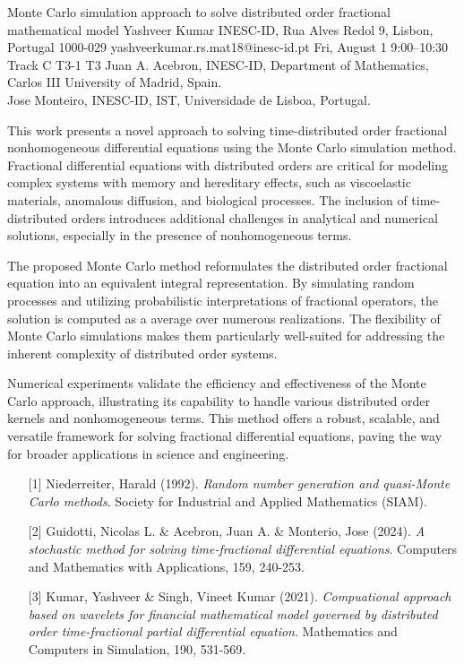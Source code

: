 \begin{talk}
  {Monte Carlo simulation approach to solve distributed order fractional mathematical model}%
  {Yashveer Kumar}%
  {INESC-ID, Rua Alves Redol 9, Lisbon, Portugal 1000-029}%
  {yashveerkumar.rs.mat18@inesc-id.pt}%
  {}%
  {}%
  {Fri, August 1 9:00–10:30 Track C}%
  {T3-1}%
  {T3}%
  {Juan A. Acebron, INESC-ID,  Department of Mathematics, Carlos III University of Madrid, Spain.\\
  	Jose Monteiro, INESC-ID, IST, Universidade de Lisboa, Portugal.}%
				
			
			
This work presents a novel approach to solving time-distributed order fractional nonhomogeneous differential equations using the Monte Carlo simulation method. Fractional differential equations with distributed orders are critical for modeling complex systems with memory and hereditary effects, such as viscoelastic materials, anomalous diffusion, and biological processes. The inclusion of time-distributed orders introduces additional challenges in analytical and numerical solutions, especially in the presence of nonhomogeneous terms.

The proposed Monte Carlo method reformulates the distributed order fractional equation into an equivalent integral representation. By simulating random processes and utilizing probabilistic interpretations of fractional operators, the solution is computed as a average over numerous realizations. The flexibility of Monte Carlo simulations makes them particularly well-suited for addressing the inherent complexity of distributed order systems.

Numerical experiments validate the efficiency and effectiveness of the Monte Carlo approach, illustrating its capability to handle various distributed order kernels and nonhomogeneous terms. This method offers a robust, scalable, and versatile framework for solving fractional differential equations, paving the way for broader applications in science and engineering.

\medskip
\begin{enumerate}
	\item[{[1]}] Niederreiter, Harald (1992). {\it Random number generation and quasi-Monte Carlo methods}. Society for Industrial and Applied Mathematics (SIAM).
	\item[{[2]}] Guidotti, Nicolas L. \& Acebron, Juan A.  \&  Monterio, Jose (2024). {\it A stochastic method for solving time-fractional differential equations}. Computers and Mathematics with Applications, 159, 240-253.
	\item[{[3]}] Kumar, Yashveer \& Singh, Vineet Kumar (2021). {\it Compuational approach based on wavelets for financial mathematical model governed by distributed order time-fractional partial differential equation}. Mathematics and Computers in Simulation, 190, 531-569.
\end{enumerate}
\end{talk}


